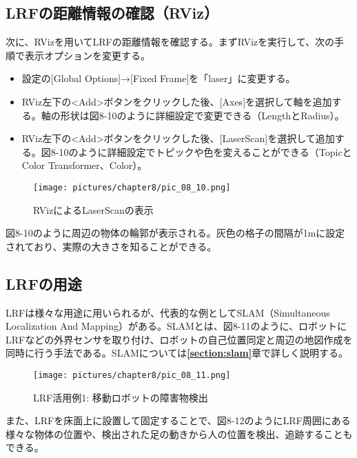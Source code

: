 \subsection{LRFの距離情報の確認（RViz）}

次に、RVizを用いてLRFの距離情報を確認する。まずRVizを実行して、次の手順で表示オプションを変更する。

\begin{itemize}
\item 設定の[Global Options]→[Fixed Frame]を「laser」に変更する。
\item RViz左下の<Add>ボタンをクリックした後、[Axes]を選択して軸を追加する。軸の形状は図8-10のように詳細設定で変更できる（LengthとRadius）。
\item RViz左下の<Add>ボタンをクリックした後、[LaserScan]を選択して追加する。図8-10のように詳細設定でトピックや色を変えることができる（TopicとColor Transformer、Color）。
\end{itemize}

\begin{figure}[htp]
  \centering
  \texttt{[image: pictures/chapter8/pic\_08\_10.png]}
  \caption{RVizによるLaserScanの表示}
\end{figure}

図8-10のように周辺の物体の輪郭が表示される。灰色の格子の間隔が1mに設定されており、実際の大きさを知ることができる。

\subsection{LRFの用途}

LRFは様々な用途に用いられるが、代表的な例としてSLAM（Simultaneous Localization And Mapping）がある。SLAMとは、図8-11のように、ロボットにLRFなどの外界センサを取り付け、ロボットの自己位置同定と周辺の地図作成を同時に行う手法である。SLAMについては\textbf{\ref{section:slam}}章で詳しく説明する。

\begin{figure}[htp]
  \centering
  \texttt{[image: pictures/chapter8/pic\_08\_11.png]}
  \caption{LRF活用例1: 移動ロボットの障害物検出}
\end{figure}

また、LRFを床面上に設置して固定することで、図8-12のようにLRF周囲にある様々な物体の位置や、検出された足の動きから人の位置を検出、追跡することもできる。


